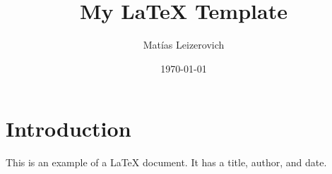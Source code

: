 \documentclass{article}
\begin{document}
\title{My LaTeX Template}
\author{Matías Leizerovich}
\date{\today}

\maketitle

\section{Introduction}
This is an example of a LaTeX document. It has a title, author, and date.
\end{document}
